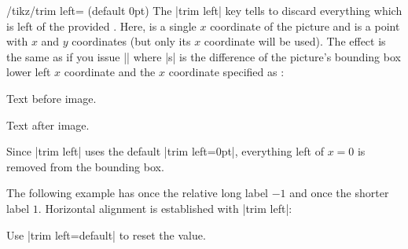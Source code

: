 \begin{key}{/tikz/trim left= (default 0pt)}
    The |trim left| key tells \pgfname\space to discard everything which is
    left of the provided . Here, 
    is a single $x$ coordinate of the picture and  is a point
    with $x$ and $y$ coordinates (but only its $x$ coordinate will be used).
    The effect is the same as if you issue |\hspace{-s}| where |s| is the
    difference of the picture's bounding box lower left $x$ coordinate and the
    $x$ coordinate specified as :
\begin{codeexample}[pre={\begin{lateximage}},post={\end{lateximage}}]
Text before image.%
Text after image.
\end{codeexample}
    Since |trim left| uses the default |trim left=0pt|, everything left of
    $x=0$ is removed from the bounding box.

    The following example has once the relative long label $-1$ and once the
    shorter label $1$. Horizontal alignment is established with |trim left|:
\begin{codeexample}[pre={\begin{lateximage}},post={\end{lateximage}}]
\par
{}
\par
{}
\par
{}
\end{codeexample}

    Use |trim left=default| to reset the value.
\end{key}


